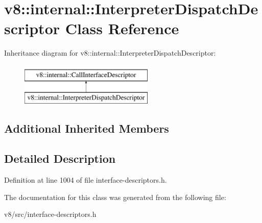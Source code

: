 \hypertarget{classv8_1_1internal_1_1InterpreterDispatchDescriptor}{}\section{v8\+:\+:internal\+:\+:Interpreter\+Dispatch\+Descriptor Class Reference}
\label{classv8_1_1internal_1_1InterpreterDispatchDescriptor}
Inheritance diagram for v8\+:\+:internal\+:\+:Interpreter\+Dispatch\+Descriptor\+:\begin{figure}[H]
\begin{center}
\leavevmode
\includegraphics[height=2.000000cm]{classv8_1_1internal_1_1InterpreterDispatchDescriptor}
\end{center}
\end{figure}
\subsection*{Additional Inherited Members}


\subsection{Detailed Description}


Definition at line 1004 of file interface-\/descriptors.\+h.



The documentation for this class was generated from the following file\+:\begin{DoxyCompactItemize}
\item 
v8/src/interface-\/descriptors.\+h\end{DoxyCompactItemize}
